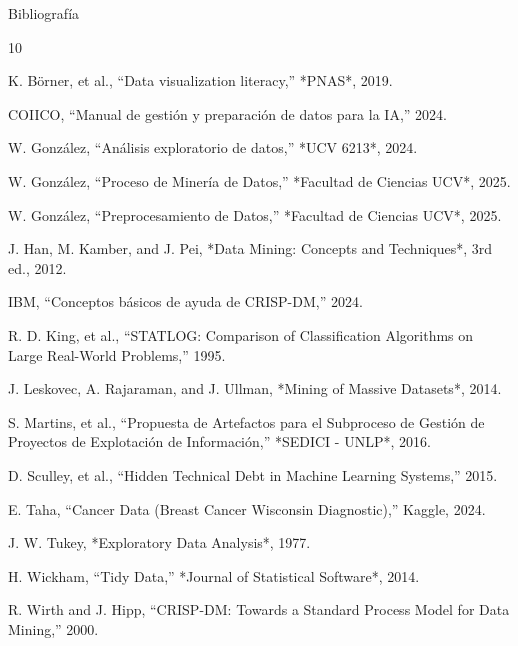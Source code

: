\documentclass{beamer}
\begin{document}
	\begin{frame}[allowframebreaks]{Bibliografía}
		\scriptsize
		\begin{thebibliography}{10}
			
			K. Börner, et al., “Data visualization literacy,” *PNAS*, 2019.
			
			COIICO, “Manual de gestión y preparación de datos para la IA,” 2024.
			
			W. González, “Análisis exploratorio de datos,” *UCV 6213*, 2024.
			
			W. González, “Proceso de Minería de Datos,” *Facultad de Ciencias UCV*, 2025.
			
			W. González, “Preprocesamiento de Datos,” *Facultad de Ciencias UCV*, 2025.
			
			J. Han, M. Kamber, and J. Pei, *Data Mining: Concepts and Techniques*, 3rd ed., 2012.
			
			IBM, “Conceptos básicos de ayuda de CRISP-DM,” 2024.
			
			R. D. King, et al., “STATLOG: Comparison of Classification Algorithms on Large Real-World Problems,” 1995.
			
			J. Leskovec, A. Rajaraman, and J. Ullman, *Mining of Massive Datasets*, 2014.
			
			S. Martins, et al., “Propuesta de Artefactos para el Subproceso de Gestión de Proyectos de Explotación de Información,” *SEDICI - UNLP*, 2016.
			
			D. Sculley, et al., “Hidden Technical Debt in Machine Learning Systems,” 2015.
			
			E. Taha, “Cancer Data (Breast Cancer Wisconsin Diagnostic),” Kaggle, 2024.
			
			J. W. Tukey, *Exploratory Data Analysis*, 1977.
			
			H. Wickham, “Tidy Data,” *Journal of Statistical Software*, 2014.
			
			R. Wirth and J. Hipp, “CRISP-DM: Towards a Standard Process Model for Data Mining,” 2000.
			
		\end{thebibliography}
	\end{frame}
	
\end{document}
